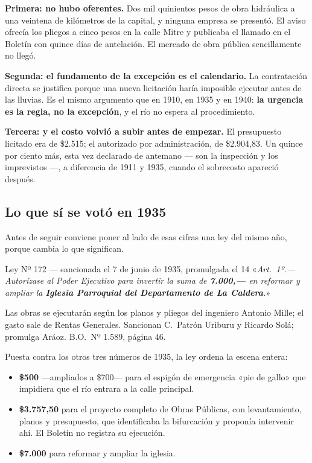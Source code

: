 \textbf{Primera: no hubo oferentes.} Dos mil quinientos pesos de obra hidráulica a una veintena de kilómetros de la capital, y ninguna empresa se presentó. El aviso ofrecía los pliegos a cinco
pesos en la calle Mitre y publicaba el llamado en el Boletín con quince días de antelación.
El mercado de obra pública sencillamente no llegó.

\textbf{Segunda: el fundamento de la excepción es el calendario.} La contratación directa se
justifica porque una nueva licitación haría imposible ejecutar antes de las lluvias. Es el
mismo argumento que en 1910, en 1935 y en 1940: \textbf{la urgencia es la regla, no la
excepción}, y el río no espera al procedimiento.

\textbf{Tercera: y el costo volvió a subir antes de empezar.} El presupuesto licitado era de
\$2.515; el autorizado por administración, de \$2.904,83. Un quince por ciento más, esta vez
declarado de antemano --- son la inspección y los imprevistos ---, a diferencia de 1911 y 1935,
cuando el sobrecosto apareció después.

\subsection*{Lo que sí se votó en 1935}

Antes de seguir conviene poner al lado de esas cifras una ley del mismo año, porque cambia lo
que significan.

\begin{ficha}{Ley Nº 172 --- sancionada el 7 de junio de 1935, promulgada el 14}
«\textit{Art.\ 1º.--- Autorízase al Poder Ejecutivo para invertir la suma de \textbf{7.000,---}
en reformar y ampliar la \textbf{Iglesia Parroquial del Departamento de La Caldera}.}»

Las obras se ejecutarán según los planos y pliegos del ingeniero Antonio Mille; el gasto sale
de Rentas Generales. Sancionan C.\ Patrón Uriburu y Ricardo Solá; promulga Aráoz. B.O.\ Nº
1.589, página 46.
\end{ficha}

Puesta contra los otros tres números de 1935, la ley ordena la escena entera:

\begin{itemize}[leftmargin=*,itemsep=1pt]
\item \textbf{\$500} ---ampliados a \$700--- para el espigón de emergencia «pie de gallo» que impidiera que el río entrara a la calle principal.
\item \textbf{\$3.757,50} para el proyecto completo de Obras Públicas, con levantamiento, planos y presupuesto, que identificaba la bifurcación y proponía intervenir ahí. El Boletín no registra su ejecución.
\item \textbf{\$7.000} para reformar y ampliar la iglesia.
\end{itemize}


